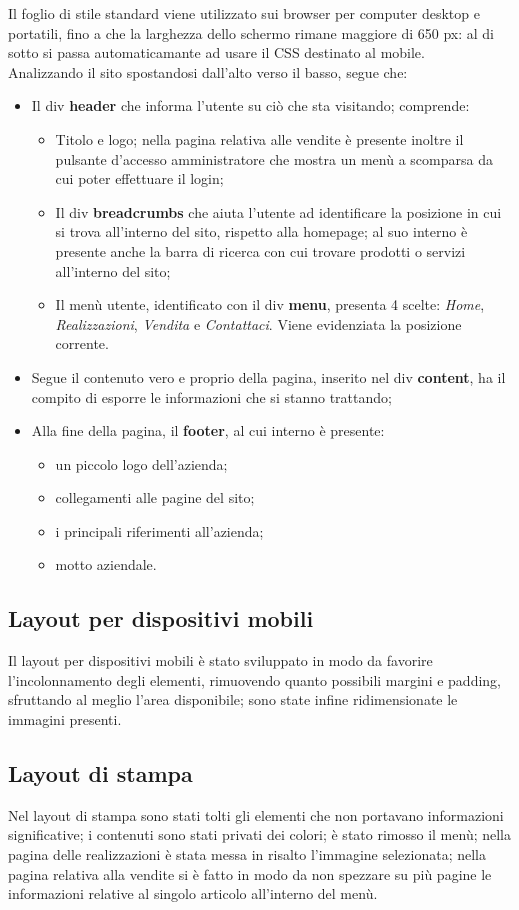 {{		Il foglio di stile standard viene utilizzato sui browser per computer desktop e portatili, fino a che la larghezza dello schermo rimane maggiore di 650 px: al di sotto si passa automaticamante ad usare il CSS destinato al mobile.
		\\
		Analizzando il sito spostandosi dall'alto verso il basso, segue che:
		\begin{itemize}\itemsep1pt
			\item Il div \textbf{header} che informa l'utente su ciò che sta visitando; comprende:
			\begin{itemize}\itemsep1pt
				\item Titolo e logo; nella pagina relativa alle vendite è presente inoltre il pulsante d'accesso amministratore che mostra un menù a scomparsa da cui poter effettuare il login;
				\item Il div \textbf{breadcrumbs} che aiuta l'utente ad identificare la posizione in cui si trova all'interno del sito, rispetto alla homepage; al suo interno è presente anche la barra di ricerca con cui trovare prodotti o servizi all'interno del sito;
				\item Il menù utente, identificato con il div \textbf{menu}, presenta 4 scelte: \textit{Home}, \textit{Realizzazioni}, \textit{Vendita} e \textit{Contattaci}. Viene evidenziata la posizione corrente. 
			\end{itemize}
			\item Segue il contenuto vero e proprio della pagina, inserito nel div \textbf{content}, ha il compito di esporre le informazioni che si stanno trattando;
			\item Alla fine della pagina, il \textbf{footer}, al cui interno è presente:
			\begin{itemize}\itemsep1pt
				\item un piccolo logo dell'azienda;
				\item collegamenti alle pagine del sito;
				\item i principali riferimenti all'azienda;
				\item motto aziendale.
			\end{itemize}
		\end{itemize}
		}
	\subsection{Layout per dispositivi mobili}{
		Il layout per dispositivi mobili è stato sviluppato in modo da favorire l'incolonnamento degli elementi, rimuovendo quanto possibili margini e padding, sfruttando al meglio l'area disponibile; sono state infine ridimensionate le immagini presenti.
	}
	\subsection{Layout di stampa}{
		Nel layout di stampa sono stati tolti gli elementi che non portavano informazioni significative; i contenuti sono stati privati dei colori; è stato rimosso il menù; nella pagina delle realizzazioni è stata messa in risalto l'immagine selezionata; nella pagina relativa alla vendite si è fatto in modo da non spezzare su più pagine le informazioni relative al singolo articolo all'interno del menù.
	}
}